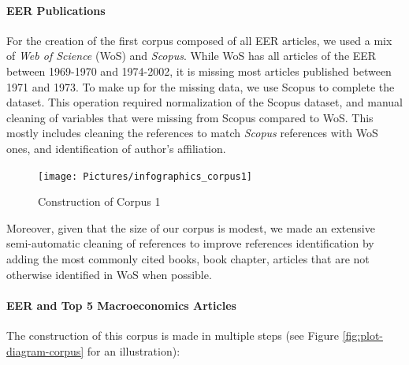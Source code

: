 \documentclass[]{elsarticle} %
\begin{document}
\hypertarget{eer-publications}{%
\paragraph*{EER Publications}\label{eer-publications}}

For the creation of the first corpus composed of all EER articles, we
used a mix of \emph{Web of Science} (WoS) and \emph{Scopus}. While WoS
has all articles of the EER between 1969-1970 and 1974-2002, it is
missing most articles published between 1971 and 1973. To make up for
the missing data, we use Scopus to complete the dataset. This operation
required normalization of the Scopus dataset, and manual cleaning of
variables that were missing from Scopus compared to WoS. This mostly
includes cleaning the references to match \emph{Scopus} references with
WoS ones, and identification of author's affiliation.

\begin{figure}[!ht]

{\centering \texttt{[image: Pictures/infographics\_corpus1]} 

}

\caption{Construction of Corpus 1}\label{fig:unnamed-chunk-1}
\end{figure}

Moreover, given that the size of our corpus is modest, we made an
extensive semi-automatic cleaning of references to improve references
identification by adding the most commonly cited books, book chapter,
articles that are not otherwise identified in WoS when possible.

\hypertarget{eer-top5-macro}{%
\paragraph*{EER and Top 5 Macroeconomics
Articles}\label{eer-top5-macro}}

The construction of this corpus is made in multiple steps (see Figure
\ref{fig:plot-diagram-corpus} for an illustration):
\end{document}
